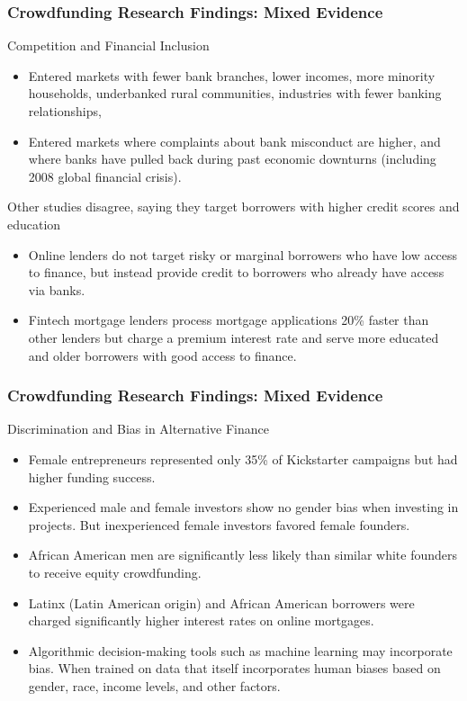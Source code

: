 \documentclass[aspectratio=169,xcolor=dvipsnames]{beamer}
\begin{document}
\begin{frame}
\frametitle{Crowdfunding Research Findings: Mixed Evidence}


Competition and Financial Inclusion
\begin{itemize}
    \item Entered markets with fewer bank branches, lower incomes, more minority households, underbanked rural communities, industries with fewer banking relationships,
    \item Entered markets where complaints about bank misconduct are higher, and where banks have pulled back during past economic downturns (including 2008 global financial crisis).
\end{itemize}

\medskip 

Other studies disagree, saying they target borrowers with higher credit scores and education
\begin{itemize}
    \item Online lenders do not target risky or marginal borrowers who have low access to finance, but instead provide credit to borrowers who already have access via banks.
    \item Fintech mortgage lenders process mortgage applications 20\% faster than other lenders but charge a premium interest rate and serve more educated and older borrowers with good access to finance.
\end{itemize}



\end{frame} 





\begin{frame}
\frametitle{Crowdfunding Research Findings: Mixed Evidence}


Discrimination and Bias in Alternative Finance
\begin{itemize}
    \item Female entrepreneurs represented only 35\% of Kickstarter campaigns but had higher funding success.
    \item Experienced male and female investors show no gender bias when investing in projects. But inexperienced female investors favored female founders.
    \item African American men are significantly less likely than similar white founders to receive equity crowdfunding.
    \item Latinx (Latin American origin) and African American borrowers were charged significantly higher interest rates on online mortgages.
    \item Algorithmic decision-making tools such as machine learning may incorporate bias. When trained on data that itself incorporates human biases based on gender, race, income levels, and other factors.
\end{itemize}



\end{frame} 
\end{document}
